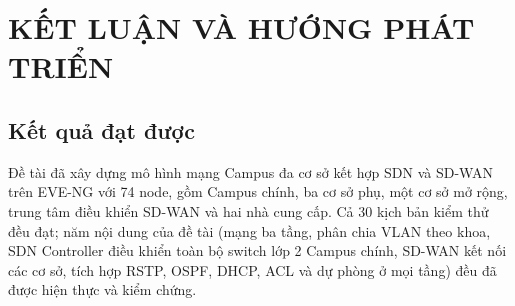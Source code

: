\section{KẾT LUẬN VÀ HƯỚNG PHÁT TRIỂN}\label{sec:ket_luan_huong_phat_trien}

\subsection{Kết quả đạt được}

Đề tài đã xây dựng mô hình mạng Campus đa cơ sở kết hợp SDN và SD-WAN trên EVE-NG với 74 node, gồm Campus chính, ba cơ sở phụ, một cơ sở mở rộng, trung tâm điều khiển SD-WAN và hai nhà cung cấp. Cả 30 kịch bản kiểm thử đều đạt; năm nội dung của đề tài (mạng ba tầng, phân chia VLAN theo khoa, SDN Controller điều khiển toàn bộ switch lớp 2 Campus chính, SD-WAN kết nối các cơ sở, tích hợp RSTP, OSPF, DHCP, ACL và dự phòng ở mọi tầng) đều đã được hiện thực và kiểm chứng.
